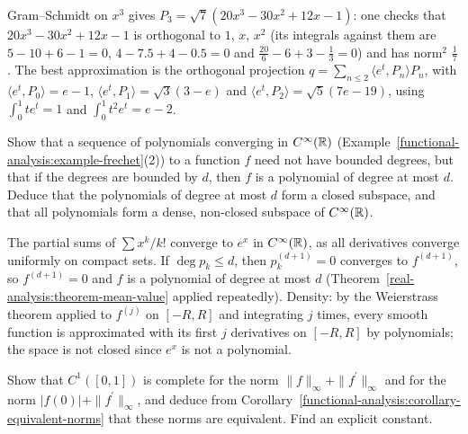 \begin{solution}
Gram--Schmidt on $x^3$ gives $P_3 = \sqrt7(20x^3 - 30x^2 + 12x - 1)$: one checks that $20x^3 - 30x^2 + 12x - 1$ is orthogonal to $1$, $x$, $x^2$ (its integrals against them are $5 - 10 + 6 - 1 = 0$,
$4 - 7.5 + 4 - 0.5 = 0$ and $\frac{20}{6} - 6 + 3 - \frac13 = 0$) and has norm$^2$ $\frac17$. The best approximation is the orthogonal projection $q = \sum_{n \leq 2}\langle e^t, P_n\rangle P_n$, with
$\langle e^t, P_0\rangle = e - 1$, $\langle e^t, P_1\rangle = \sqrt3(3 - e)$ and $\langle e^t, P_2\rangle = \sqrt5(7e - 19)$, using $\int_0^1te^t = 1$ and $\int_0^1t^2e^t = e - 2$.
\end{solution}

\begin{exercise}\label{functional-analysis:exercise-frechet-polynomials}
Show that a sequence of polynomials converging in $C^\infty(\mathbb{R})$ (Example~\ref{functional-analysis:example-frechet}(2)) to a function $f$ need not have bounded degrees, but that if the degrees are bounded
by $d$, then $f$ is a polynomial of degree at most $d$. Deduce that the polynomials of degree at most $d$ form a closed subspace, and that all polynomials form a dense, non-closed subspace of $C^\infty(\mathbb{R})$.
\end{exercise}

\begin{solution}
The partial sums of $\sum x^k/k!$ converge to $e^x$ in $C^\infty(\mathbb{R})$, as all derivatives converge uniformly on compact sets. If $\deg p_k \leq d$, then $p_k^{(d+1)} = 0$ converges to $f^{(d+1)}$, so
$f^{(d+1)} = 0$ and $f$ is a polynomial of degree at most $d$ (Theorem~\ref{real-analysis:theorem-mean-value} applied repeatedly). Density: by the Weierstrass theorem applied to $f^{(j)}$ on $[-R, R]$ and
integrating $j$ times, every smooth function is approximated with its first $j$ derivatives on $[-R, R]$ by polynomials; the space is not closed since $e^x$ is not a polynomial.
\end{solution}

\begin{exercise}\label{functional-analysis:exercise-equivalent-norms}
Show that $C^1([0, 1])$ is complete for the norm $\|f\|_\infty + \|f^{\prime}\|_\infty$ and for the norm $|f(0)| + \|f^{\prime}\|_\infty$, and deduce from Corollary~\ref{functional-analysis:corollary-equivalent-norms} that these
norms are equivalent. Find an explicit constant.
\end{exercise}

